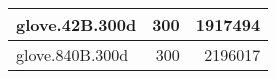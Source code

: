 \begin{tabular}{| l | r | r |}
    \hline
    
    glove.42B.300d & 300 & \num{1917494} \\ %
    
    \hline
    
    glove.840B.300d & 300 & \num{2196017} \\ %
    
    \hline
\end{tabular}

